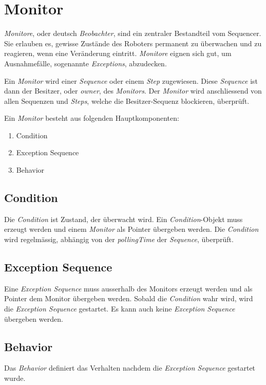 \section{Monitor}
\label{Monitor}
\textit{Monitore}, oder deutsch \textit{Beobachter}, sind ein zentraler Bestandteil vom Sequencer.
Sie erlauben es, gewisse Zustände des Roboters permanent zu überwachen und zu reagieren, wenn eine Veränderung eintritt.
\textit{Monitore} eignen sich gut, um Ausnahmefälle, sogenannte \textit{Exceptions}, abzudecken.

Ein \textit{Monitor} wird einer \textit{Sequence} oder einem \textit{Step} zugewiesen.
Diese \textit{Sequence} ist dann der Besitzer, oder \textit{owner}, des \textit{Monitors}.
Der \textit{Monitor} wird anschliessend von allen Sequenzen und \textit{Steps}, welche die Besitzer-Sequenz blockieren, überprüft.

Ein \textit{Monitor} besteht aus folgenden Hauptkomponenten:
\begin{enumerate}
\item Condition 
\item Exception Sequence
\item Behavior
\end{enumerate}

\subsection{Condition}
Die \textit{Condition} ist Zustand, der überwacht wird.
Ein \textit{Condition}-Objekt muss erzeugt werden und einem \textit{Monitor} als Pointer übergeben werden.
Die \textit{Condition} wird regelmässig, abhängig von der \textit{pollingTime} der \textit{Sequence}, überprüft.


\subsection{Exception Sequence}
Eine \textit{Exception Sequence} muss ausserhalb des Monitors erzeugt werden und als Pointer dem Monitor übergeben werden.
Sobald die \textit{Condition} wahr wird, wird die \textit{Exception Sequence} gestartet.
Es kann auch keine \textit{Exception Sequence} übergeben werden.

\subsection{Behavior}
Das \textit{Behavior} definiert das Verhalten nachdem die \textit{Exception Sequence} gestartet wurde.

